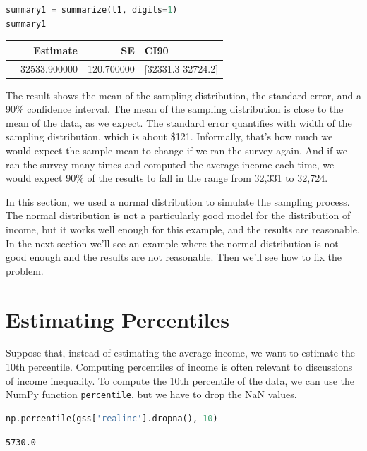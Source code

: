 \begin{lstlisting}[language=Python,style=source]
summary1 = summarize(t1, digits=1)
summary1
\end{lstlisting}

\begin{tabular}{lrrl}
\midrule
 & Estimate & SE & CI90 \\
\midrule
 & 32533.900000 & 120.700000 & [32331.3 32724.2] \\
\midrule
\end{tabular}

The result shows the mean of the sampling distribution, the standard
error, and a 90\% confidence interval. The mean of the sampling
distribution is close to the mean of the data, as we expect. The
standard error quantifies with width of the sampling distribution, which
is about \$121. Informally, that's how much we would expect the sample
mean to change if we ran the survey again. And if we ran the survey many
times and computed the average income each time, we would expect 90\% of
the results to fall in the range from 32,331 to 32,724.

In this section, we used a normal distribution to simulate the sampling
process. The normal distribution is not a particularly good model for
the distribution of income, but it works well enough for this example,
and the results are reasonable. In the next section we'll see an example
where the normal distribution is not good enough and the results are not
reasonable. Then we'll see how to fix the problem.

\section{Estimating Percentiles}\label{estimating-percentiles}

Suppose that, instead of estimating the average income, we want to
estimate the 10th percentile. Computing percentiles of income is often
relevant to discussions of income inequality. To compute the 10th
percentile of the data, we can use the NumPy function
\passthrough{\lstinline!percentile!}, but we have to drop the NaN
values.

\begin{lstlisting}[language=Python,style=source]
np.percentile(gss['realinc'].dropna(), 10)
\end{lstlisting}

\begin{lstlisting}[style=output]
5730.0
\end{lstlisting}

